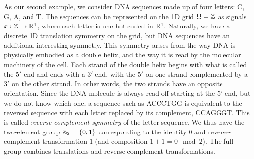 As our second example, we consider DNA sequences made up of four letters: C, G, A, and T. 
%
The sequences can be represented on the 1D grid $\Omega = \mathbb{Z}$ as signals $x : \mathbb{Z} \rightarrow \mathbb{R}^4$, where each letter is one-hot coded in $\mathbb{R}^4$. 
Naturally, we have a discrete 1D translation symmetry on the grid, but DNA sequences have an additional interesting symmetry.
This symmetry arises from the way DNA is physically embodied as a double helix, and the way it is read by the molecular machinery of the cell. 
%
Each strand of the double helix begins with what is called the $5'$-end and ends with a $3'$-end, with the $5'$ on one strand complemented by a $3'$ on the other strand.
In other words, the two strands have an opposite orientation.
Since the DNA molecule is always read off starting at the $5'$-end, but we do not know which one, a sequence such as ACCCTGG is equivalent to the reversed sequence with each letter replaced by its complement, CCAGGGT.
This is called {\em reverse-complement symmetry} of the letter sequence.
We thus have the two-element group $\mathbb{Z}_2 = \{0, 1\}$ corresponding to the identity $0$ and reverse-complement transformation $1$ (and composition $1 + 1 = 0 \mod{2}$).
The full group combines translations and reverse-complement transformations.



